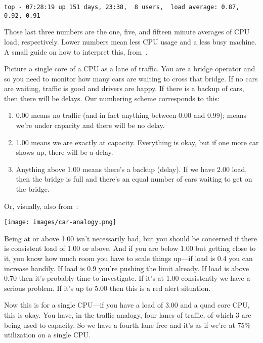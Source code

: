 \begin{verbatim}
top - 07:28:19 up 151 days, 23:38,  8 users,  load average: 0.87, 0.92, 0.91
\end{verbatim}

Those last three numbers are the one, five, and fifteen minute averages of CPU load, respectively. Lower numbers mean less CPU usage and a less busy machine. A small guide on how to interpret this, from~\cite{scout}.

Picture a single core of a CPU as a lane of traffic. You are a bridge operator and so you need to monitor how many cars are waiting to cross that bridge. If no cars are waiting, traffic is good and drivers are happy. If there is a backup of cars, then there will be delays. Our numbering scheme corresponds to this:

\begin{enumerate}
	\item 0.00 means no traffic (and in fact anything between 0.00 and 0.99); means we're under capacity and there will be no delay.
	\item 1.00 means we are exactly at capacity. Everything is okay, but if one more car shows up, there will be a delay.
	\item Anything above 1.00 means there's a backup (delay). If we have 2.00 load, then the bridge is full and there's an equal number of cars waiting to get on the bridge. 
\end{enumerate}

Or, visually, also from~\cite{scout}:

\begin{center}
	\texttt{[image: images/car-analogy.png]}
\end{center}

Being at or above 1.00 isn't necessarily bad, but you should be concerned if there is consistent load of 1.00 or above. And if you are below 1.00 but getting close to it, you know how much room you have to scale things up---if load is 0.4 you can increase handily. If load is 0.9 you're pushing the limit already. If load is above 0.70 then it's probably time to investigate. If it's at 1.00 consistently we have a serious problem. If it's up to 5.00 then this is a red alert situation.

Now this is for a single CPU---if you have a load of 3.00 and a quad core CPU, this is okay. You have, in the traffic analogy, four lanes of traffic, of which 3 are being used to capacity. So we have a fourth lane free and it's as if we're at 75\% utilization on a single CPU.


